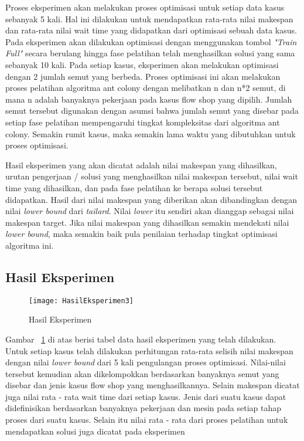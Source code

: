 Proses eksperimen akan melakukan proses optimisasi untuk setiap data kasus sebanyak 5 kali.
Hal ini dilakukan untuk mendapatkan rata-rata nilai makespan dan rata-rata nilai wait time yang didapatkan dari optimisasi
sebuah data kasus. Pada eksperimen akan dilakukan optimisasi dengan menggunakan tombol \textit{"Train Full"} secara berulang hingga fase pelatihan telah menghasilkan solusi yang sama sebanyak 10 kali. Pada setiap kasus, eksperimen akan melakukan optimisasi dengan 2 jumlah semut yang berbeda.
Proses optimisasi ini akan melakukan proses pelatihan algoritma ant colony dengan melibatkan n
dan n*2 semut, di mana n adalah banyaknya pekerjaan pada kasus flow shop yang dipilih.
Jumlah semut tersebut digunakan dengan asumsi bahwa jumlah semut yang disebar pada setiap fase pelatihan mempengaruhi
tingkat kompleksitas dari algoritma ant colony. Semakin rumit kasus, maka semakin lama waktu yang dibutuhkan untuk proses optimisasi.

Hasil eksperimen yang akan dicatat adalah nilai makespan yang dihasilkan, urutan pengerjaan /
solusi yang menghasilkan nilai makespan tersebut, nilai wait time yang dihasilkan, dan pada fase pelatihan ke berapa solusi tersebut
didapatkan. Hasil dari nilai makespan yang diberikan akan dibandingkan dengan nilai \textit{lower bound} dari \textit{tailard}. Nilai \textit{lower} itu sendiri akan dianggap sebagai nilai makespan target. Jika nilai makespan yang dihasilkan semakin mendekati nilai \textit{lower bound}, maka semakin baik pula penilaian terhadap tingkat optimisasi algoritma ini.

\subsection{Hasil Eksperimen}

\begin{figure}[H]
	\centering
	\texttt{[image: HasilEksperimen3]}
	\caption[Hasil Eksperimen]{Hasil Eksperimen}
	\label{fig:hasileksperimen}
\end{figure}

Gambar ~\ref{fig:hasileksperimen} di atas berisi tabel data hasil eksperimen yang telah dilakukan. Untuk setiap kasus telah dilakukan perhitungan rata-rata selisih nilai makespan dengan nilai \textit{lower bound} dari 5 kali pengulangan proses optimisasi. Nilai-nilai tersebut kemudian akan dikelompokkan berdasarkan banyaknya semut yang disebar dan jenis kasus flow shop yang menghasilkannya. Selain makespan dicatat juga nilai rata - rata wait time dari setiap kasus. Jenis dari suatu kasus dapat didefinisikan berdasarkan banyaknya pekerjaan dan mesin pada setiap tahap proses dari suatu kasus. Selain itu nilai rata - rata dari proses pelatihan untuk mendapatkan solusi juga dicatat pada eksperimen

